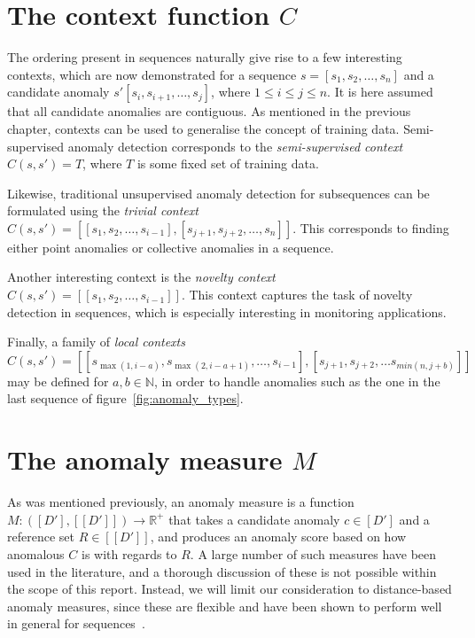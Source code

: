 \section{The context function \texorpdfstring{$C$}{C}}
\label{sect:context}

The ordering present in sequences naturally give rise to a few interesting contexts, which are now demonstrated for a sequence $s = [s_1, s_2, \dots, s_n]$ and a candidate anomaly $s' [s_i, s_{i + 1}, \dots, s_j]$, where $1 \leq i \leq j \leq n$. It is here assumed that all candidate anomalies are contiguous. As mentioned in the previous chapter, contexts can be used to generalise the concept of training data. Semi-supervised anomaly detection corresponds to the \emph{semi-supervised context} $C(s, s') = T$, where $T$ is some fixed set of training data.

Likewise, traditional unsupervised anomaly detection for subsequences can be formulated using the \emph{trivial context} $C(s, s') = [[s_1, s_2, \dots, s_{i - 1}], [s_{j + 1}, s_{j + 2}, \dots, s_n]]$. This corresponds to finding either point anomalies or collective anomalies in a sequence.

Another interesting context is the \emph{novelty context} $C(s, s') = [[s_1, s_2, \dots, s_{i - 1}]]$. This context captures the task of novelty detection in sequences, which is especially interesting in monitoring applications.

Finally, a family of \emph{local contexts}
\[
    C(s, s') = [[s_{\max(1, i - a)}, s_{\max(2, i - a + 1)}, \dots, s_{i-1}], [s_{j+1}, s_{j+2}, \ldots s_{min(n, j+b)}]]
\]
may be defined for $a, b \in \mathbb{N}$, in order to handle anomalies such as the one in the last sequence of figure~\ref{fig:anomaly_types}.

\section{The anomaly measure \texorpdfstring{$M$}{M}}
\label{sect:anomeasure}

As was mentioned previously, an anomaly measure is a function $M: ([D'], [[D']]) \rightarrow \mathbb{R}^+$ that takes a candidate anomaly $c \in [D']$ and a reference set $R \in [[D']]$, and produces an anomaly score based on how anomalous $C$ is with regards to $R$. A large number of such measures have been used in the literature, and a thorough discussion of these is not possible within the scope of this report. Instead, we will limit our consideration to distance-based anomaly measures, since these are flexible and have been shown to perform well in general for sequences~\cite{chandola3}.

